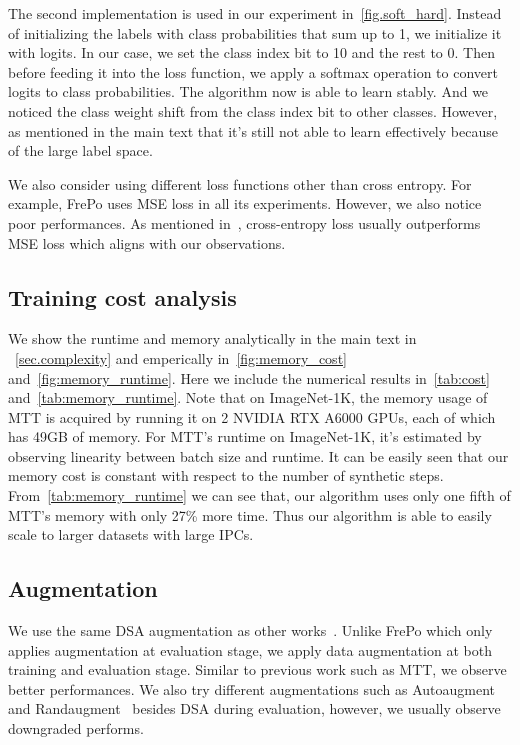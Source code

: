 \documentclass[10pt,twocolumn,letterpaper]{article}
\begin{document}
The second implementation is used in our experiment in~\cref{fig.soft_hard}. Instead of initializing the labels with class probabilities that sum up to 1, we initialize it with logits. In our case, we set the class index bit to 10 and the rest to 0. Then before feeding it into the loss function, we apply a softmax operation to convert logits to class probabilities. The algorithm now is able to learn stably. And we noticed the class weight shift from the class index bit to other classes. However, as mentioned in the main text that it's still not able to learn effectively because of the large label space.

We also consider using different loss functions other than cross entropy. For example, FrePo uses MSE loss in all its experiments. However, we also notice poor performances. As mentioned in~\cite{zhou2022dataset}, cross-entropy loss usually outperforms MSE loss which aligns with our observations.

\subsection{Training cost analysis}
\label{sec.appendix.cost}
We show the runtime and memory analytically in the main text in ~\cref{sec.complexity} and emperically in~\cref{fig:memory_cost} and~\cref{fig:memory_runtime}. Here we include the numerical results in~\cref{tab:cost} and~\cref{tab:memory_runtime}. Note that on ImageNet-1K, the memory usage of MTT is acquired by running it on 2 NVIDIA RTX A6000 GPUs, each of which has 49GB of memory. For MTT's runtime on ImageNet-1K, it's estimated by observing linearity between batch size and runtime.  It can be easily seen that our memory cost is constant with respect to the number of synthetic steps. From~\cref{tab:memory_runtime} we can see that, our algorithm uses only one fifth of MTT's memory with only 27\% more time. Thus our algorithm is able to easily scale to larger datasets with large IPCs.

\subsection{Augmentation}
We use the same DSA augmentation as other works~\cite{zhaodsa, cazenavette2022dataset, zhou2022dataset}. Unlike FrePo which only applies augmentation at evaluation stage, we apply data augmentation at both training and evaluation stage. Similar to previous work such as MTT, we observe better performances. We also try different augmentations such as Autoaugment~\cite{cubuk2018autoaugment} and Randaugment~\cite{cubuk2020randaugment} besides DSA during evaluation, however, we usually observe downgraded performs.
\end{document}
